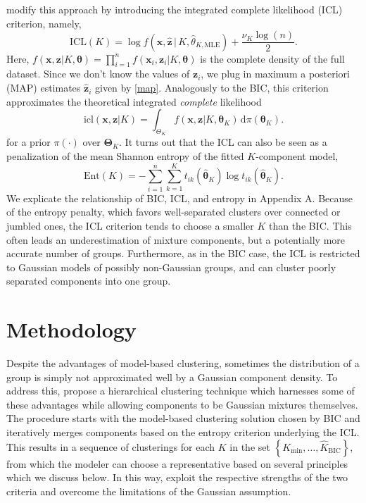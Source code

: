 \documentclass{uwstat572}
\newcommand*\set[1]{\left\{#1\right\}}
\newcommand*\estim[1]{\widehat{#1}}
\newcommand*\der{\text{d}}
\newcommand*\bx{\mathbf{x}}
\newcommand*\bz{\mathbf{z}}
\newcommand*\btheta{\boldsymbol{\theta}}
\newcommand*\bTheta{\boldsymbol{\Theta}}
\renewcommand\;{\,}
\begin{document}
\citet{Biernacki00} modify this approach by introducing the integrated complete likelihood (ICL) criterion, namely,
\begin{equation}
\text{ICL}(K)
	= 
	\log f \left(\bx, \estim\bz \;\big|\; K, \estim\theta_{K, \text{MLE}}\right)
		 + \frac{ \nu_K \log(n) }{2}.
\end{equation}
Here, $f(\bx, \bz | K, \btheta) = \prod_{i=1}^n f(\bx_i, \bz_i | K, \btheta)$ is the complete density of the full dataset.
Since we don't know the values of $\bz_i$, we plug in maximum a posteriori (MAP) estimates $\estim\bz_i$ given by \eqref{map}.
Analogously to the BIC, this criterion approximates the theoretical integrated \emph{complete} likelihood
\begin{equation}
\text{icl}(\bx, \bz | K)
	 = \int_{\Theta_K} f(\bx, \bz | K, \btheta_K) \; \der \pi(\btheta_K).
\end{equation}
for a prior $\pi(\cdot)$ over $\bTheta_K$.
It turns out that the ICL can also be seen as a penalization of the mean Shannon entropy of the fitted $K$-component model, 
\begin{equation}
\text{Ent}(K)
	 = - \sum_{i=1}^n \sum_{k = 1}^K t_{ik}\left(\estim\btheta_K \right) 
	 	\log t_{ik}\left(\estim\btheta_K \right).
\end{equation}
We explicate the relationship of BIC, ICL, and entropy in Appendix A.
Because of the entropy penalty, which favors well-separated clusters over connected or jumbled ones, the ICL criterion tends to choose a smaller $K$ than the BIC.
This often leads an underestimation of mixture components, but a potentially more accurate number of groups.
Furthermore, as in the BIC case, the $\text{ICL}$ is restricted to Gaussian models of possibly non-Gaussian groups, and can cluster poorly separated components into one group.


\section{Methodology}
Despite the advantages of model-based clustering, sometimes the distribution of a group is simply not approximated well by a Gaussian component density.
To address this, \cite{Baudry10} propose a hierarchical clustering technique which harnesses some of these advantages while allowing components to be Gaussian mixtures themselves. 
The procedure starts with the model-based clustering solution chosen by BIC and iteratively merges components based on the entropy criterion underlying the ICL.
This results in a sequence of clusterings for each $K$ in the set $\set{K_\text{min}, \dotsc, \estim K_\text{BIC}}$, from which the modeler can choose a representative based on several principles which we discuss below.
In this way, \cite{Baudry10} exploit the respective strengths of the two criteria and overcome the limitations of the Gaussian assumption.
\end{document}
